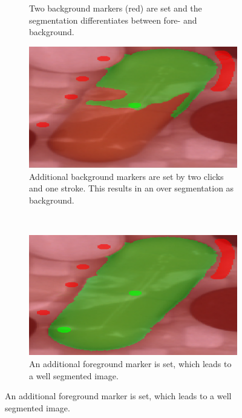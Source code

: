 \begin{figure}
\begin{subfigure}[t]{0.45\textwidth}
		\caption{
			Two background markers (red) are set and the segmentation differentiates between fore- and background.\\
		} \label{fig:ch3:sec3:application3}
	\end{subfigure}
	\hfill
	\begin{subfigure}[t]{0.45\textwidth}
		\centering
		\includegraphics[width=\textwidth]{figures/chap32_watershed_application4.png}
		\caption{
			Additional background markers are set by two clicks and one stroke. 
			This results in an over segmentation as background.
		} \label{fig:ch3:sec3:application4}
	\end{subfigure}
	\\
	\begin{subfigure}[t]{0.45\textwidth}
		\centering
		\includegraphics[width=\textwidth]{figures/chap32_watershed_application5.png}
		\caption{
			An additional foreground marker is set, which leads to a well segmented image.
		} \label{fig:ch3:sec3:application5}
	\end{subfigure}

\end{figure}
